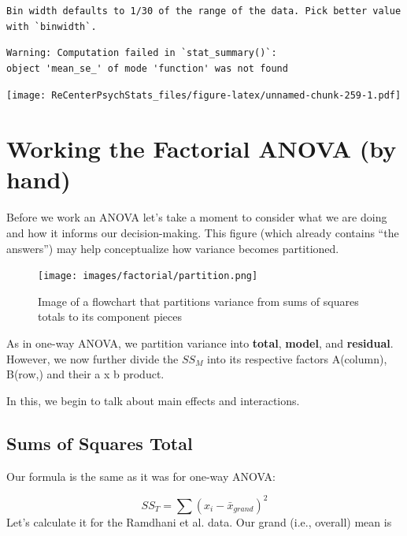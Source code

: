 \documentclass[
  11pt,
]{book}
\newenvironment{Shaded}{\begin{snugshade}}{\end{snugshade}}
\newcommand{\FunctionTok}[1]{\textcolor[rgb]{0.00,0.00,0.00}{#1}}
\newcommand{\NormalTok}[1]{#1}
\newcommand{\SpecialCharTok}[1]{\textcolor[rgb]{0.00,0.00,0.00}{#1}}
\begin{document}
\begin{verbatim}
Bin width defaults to 1/30 of the range of the data. Pick better value with `binwidth`.
\end{verbatim}

\begin{verbatim}
Warning: Computation failed in `stat_summary()`:
object 'mean_se_' of mode 'function' was not found
\end{verbatim}

\texttt{[image: ReCenterPsychStats\_files/figure-latex/unnamed-chunk-259-1.pdf]}

\hypertarget{working-the-factorial-anova-by-hand}{%
\section{Working the Factorial ANOVA (by hand)}\label{working-the-factorial-anova-by-hand}}

Before we work an ANOVA let's take a moment to consider what we are doing and how it informs our decision-making. This figure (which already contains ``the answers'') may help conceptualize how variance becomes partitioned.

\begin{figure}
\centering
\texttt{[image: images/factorial/partition.png]}
\caption{Image of a flowchart that partitions variance from sums of squares totals to its component pieces}
\end{figure}

As in one-way ANOVA, we partition variance into \textbf{total}, \textbf{model}, and \textbf{residual}. However, we now further divide the \(SS_M\) into its respective factors A(column), B(row,) and their a x b product.

In this, we begin to talk about main effects and interactions.

\hypertarget{sums-of-squares-total-1}{%
\subsection{Sums of Squares Total}\label{sums-of-squares-total-1}}

Our formula is the same as it was for one-way ANOVA:

\[SS_{T}= \sum (x_{i}-\bar{x}_{grand})^{2}\]
Let's calculate it for the Ramdhani et al. \citeyearpar{ramdhani_affective_2018} data.
Our grand (i.e., overall) mean is

\begin{Shaded}
\end{Shaded}
\end{document}
